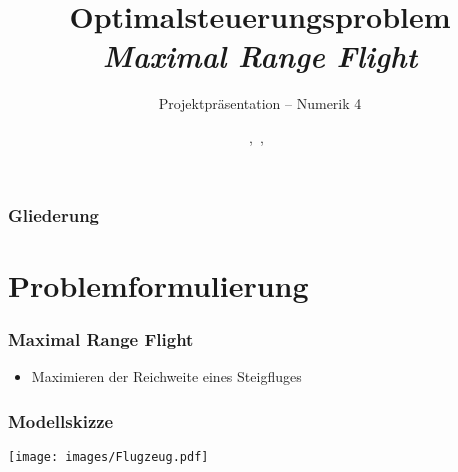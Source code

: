 \documentclass[aspectratio=169]{beamer}
\title{\textbf{Optimalsteuerungsproblem  \\ \textit{Maximal Range Flight}}}
\subtitle{Projektpräsentation -- Numerik 4}
\author{\Heiko,\ \Philipp,\ \Felix}
\institute{\institut, \fakultaet\\}
\begin{document}
\hspace*{-1.49cm}
\frame[plain]{\titlepage}

\hspace*{-0.7cm}
\begin{frame}
  \frametitle{Gliederung}
  \tableofcontents
\end{frame}


\section{Problemformulierung}
\begin{frame}
  \frametitle{Maximal Range Flight}
  \vspace{1em}
  \begin{itemize}
    \item Maximieren der Reichweite eines Steigfluges
  \end{itemize}
\end{frame}


\begin{frame}
  \frametitle{Modellskizze}
  \vspace{1em}
  \texttt{[image: images/Flugzeug.pdf]}
\end{frame}
\end{document}
